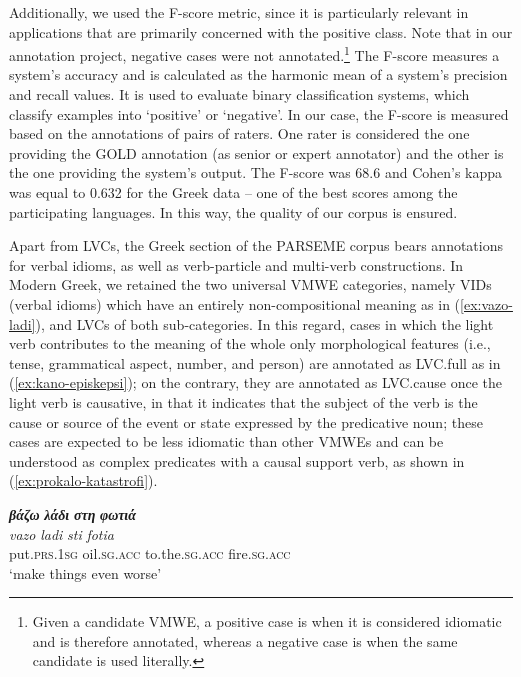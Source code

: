\documentclass[output=paper,colorlinks,citecolor=brown]{langscibook}
\begin{document}
Additionally, we used the F-score metric, since it is particularly relevant in applications that are primarily concerned with the positive class. Note that in our annotation project, negative cases were not annotated.\footnote{Given a candidate VMWE, a positive case is when it is considered idiomatic and is therefore annotated, whereas a negative case is when the same candidate is used literally.} The F-score measures a system’s accuracy and is calculated as the harmonic mean of a system's precision and recall values. It is used to evaluate binary classification systems, which classify examples into `positive' or `negative'. In our case, the F-score is measured based on the annotations of pairs of raters. One rater is considered the one providing the GOLD annotation (as senior or expert annotator) and the other is the one providing the system's output. The F-score was 68.6 and Cohen's kappa was equal to 0.632 for the Greek data \citep{Savary-et-al-PMWE-2018} -- one of the best scores among the participating languages. In this way, the quality of our corpus is ensured.

Apart from LVCs, the Greek section of the PARSEME corpus bears annotations for verbal idioms, as well as verb-particle and multi-verb constructions. In Modern Greek, we retained the two universal VMWE categories, namely VIDs (verbal idioms) which have an entirely non-compositional meaning as in (\ref{ex:vazo-ladi}), and LVCs of both sub-categories. In this regard, cases in which the light verb contributes to the meaning of the whole only morphological features (i.e., tense, grammatical aspect, number, and person) are annotated as LVC.full as in (\ref{ex:kano-episkepsi}); on the contrary, they are annotated as LVC.cause once the light verb is causative, in that it indicates that the subject of the verb is the cause or source of the event or state expressed by the predicative noun; these cases are expected to be less idiomatic than other VMWEs and can be understood as complex predicates with a causal support verb, as shown in (\ref{ex:prokalo-katastrofi}).

\ea
\label{ex:vazo-ladi}
\settowidth {}
\glll
\textbf{\em{βάζω}} \textbf{\em{λάδι}} \textbf{\em{στη}} \textbf{\em{φωτιά}}  \\
\textit{vazo} \textit{ladi} \textit{sti} \textit{fotia} \\
put.\textsc{prs.1sg} oil.\textsc{sg.acc} to.the.\textsc{sg.acc}  fire.\textsc{sg.acc} \\
\glt ‘make things even worse’
\z
\end{document}
